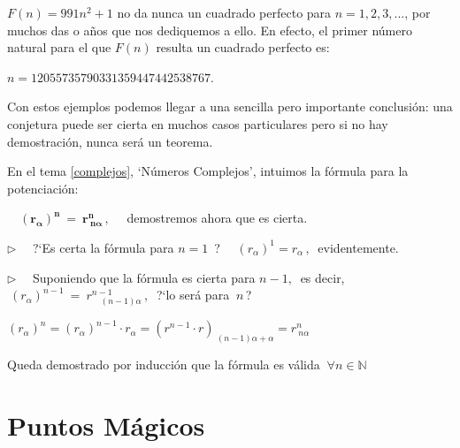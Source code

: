  	    \begin{ejem}
 			$F(n)=991n^2+1$ no da nunca un cuadrado perfecto para $n=1,2,3,...$, por muchos das o años que nos dediquemos a ello. En efecto, el primer número natural para el que $F(n)$ resulta un cuadrado perfecto es:
 			
 			$n=12055735790331359447442538767.$
 		\end{ejem}
 		
 		 Con estos ejemplos podemos llegar a una sencilla pero importante conclusión: una conjetura puede ser cierta en muchos casos particulares pero si no hay demostración, nunca será un teorema.
 		 
 		 
\vspace{1cm}

\begin{miejercicio}

En el tema \ref{complejos}, `Números Complejos', intuimos la fórmula para	la potenciación: 

$ \quad \boldsymbol{ (r_\alpha)^n\ = \ r^n_{	\ n\alpha} }\, , \quad $ demostremos ahora que es cierta.

\vspace{2mm} \photon \photon \photon \photon \photon \photon \photon \photon \photon \photon \photon \photon \photon 

\vspace{2mm} $\triangleright\quad$ ?`Es certa la fórmula para $n=1\, $ ? $\quad (r_\alpha)^1=r_\alpha\, , \ $ evidentemente.

\vspace{2mm} $\triangleright\quad$ Suponiendo que la fórmula es cierta para $n-1,\ $ es decir, $\ (r_\alpha)^{n-1} \ = \ r^{n-1}_{\quad (n-1)\alpha}\, , \ $ ?`lo será para $\ n\, $?

\vspace{2mm} $(r_\alpha)^n= (r_\alpha)^{n-1} \cdot r_\alpha=(r^{n-1} \cdot r)_{\ (n-1)\alpha+\alpha}=r^n_{\ n\alpha} $ \QED

\vspace{2mm} Queda demostrado por inducción que la fórmula es válida $\ \forall n\in \mathbb N$
\end{miejercicio}

 
 
 
 
 


\chapter{Puntos Mágicos}\label{puntosmagicos}


